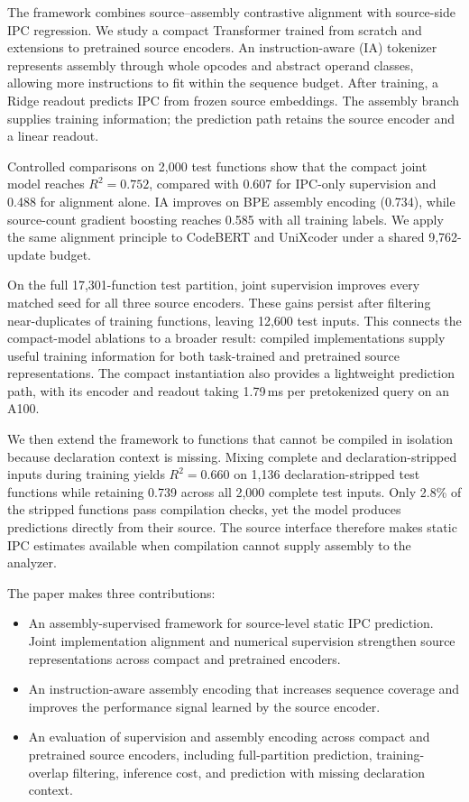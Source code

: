 \documentclass[conference]{IEEEtran}
\newenvironment{newtext}{\begingroup}{\endgroup}
\newcommand{\Rsq}{R^{2}}
\begin{document}
\begin{newtext}
The framework combines source--assembly contrastive alignment with source-side IPC regression. We study a compact Transformer trained from scratch and extensions to pretrained source encoders. An instruction-aware (IA) tokenizer represents assembly through whole opcodes and abstract operand classes, allowing more instructions to fit within the sequence budget. After training, a Ridge readout predicts IPC from frozen source embeddings. The assembly branch supplies training information; the prediction path retains the source encoder and a linear readout.

Controlled comparisons on 2,000 test functions show that the compact joint model reaches $\Rsq=0.752$, compared with 0.607 for IPC-only supervision and 0.488 for alignment alone. IA improves on BPE assembly encoding (0.734), while source-count gradient boosting reaches 0.585 with all training labels. We apply the same alignment principle to CodeBERT and UniXcoder under a shared 9,762-update budget.

On the full 17,301-function test partition, joint supervision improves every matched seed for all three source encoders. These gains persist after filtering near-duplicates of training functions, leaving 12,600 test inputs. This connects the compact-model ablations to a broader result: compiled implementations supply useful training information for both task-trained and pretrained source representations. The compact instantiation also provides a lightweight prediction path, with its encoder and readout taking 1.79\,ms per pretokenized query on an A100.

We then extend the framework to functions that cannot be compiled in isolation because declaration context is missing. Mixing complete and declaration-stripped inputs during training yields $\Rsq=0.660$ on 1,136 declaration-stripped test functions while retaining 0.739 across all 2,000 complete test inputs. Only 2.8\% of the stripped functions pass compilation checks, yet the model produces predictions directly from their source. The source interface therefore makes static IPC estimates available when compilation cannot supply assembly to the analyzer.

The paper makes three contributions:
\begin{itemize}
\item An assembly-supervised framework for source-level static IPC prediction. Joint implementation alignment and numerical supervision strengthen source representations across compact and pretrained encoders.
\item An instruction-aware assembly encoding that increases sequence coverage and improves the performance signal learned by the source encoder.
\item An evaluation of supervision and assembly encoding across compact and pretrained source encoders, including full-partition prediction, training-overlap filtering, inference cost, and prediction with missing declaration context.
\end{itemize}
\end{newtext}
\end{document}
